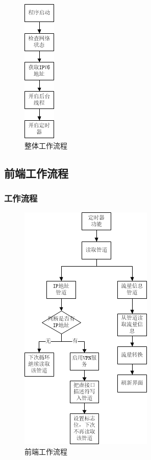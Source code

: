 \documentclass[paper=a4, fontsize=11pt, UTF8]{article} %
\numberwithin{equation}{section} %
\numberwithin{figure}{section} %
\numberwithin{table}{section} %
\begin{document}
\begin{figure}[htp]
\center
\includegraphics[scale=1]{fig2}
\caption{整体工作流程}\label{fig2}
\end{figure}


\subsection{前端工作流程}

\subsubsection{工作流程}

\begin{figure}[htp]
\center
\includegraphics[scale=0.9]{fig4}
\caption{前端工作流程}\label{fig4}
\end{figure}
\end{document}
